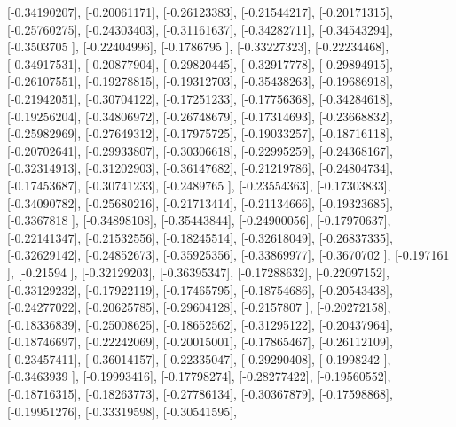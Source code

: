 \documentclass{article}
\begin{document}
       [-0.34190207],
       [-0.20061171],
       [-0.26123383],
       [-0.21544217],
       [-0.20171315],
       [-0.25760275],
       [-0.24303403],
       [-0.31161637],
       [-0.34282711],
       [-0.34543294],
       [-0.3503705 ],
       [-0.22404996],
       [-0.1786795 ],
       [-0.33227323],
       [-0.22234468],
       [-0.34917531],
       [-0.20877904],
       [-0.29820445],
       [-0.32917778],
       [-0.29894915],
       [-0.26107551],
       [-0.19278815],
       [-0.19312703],
       [-0.35438263],
       [-0.19686918],
       [-0.21942051],
       [-0.30704122],
       [-0.17251233],
       [-0.17756368],
       [-0.34284618],
       [-0.19256204],
       [-0.34806972],
       [-0.26748679],
       [-0.17314693],
       [-0.23668832],
       [-0.25982969],
       [-0.27649312],
       [-0.17975725],
       [-0.19033257],
       [-0.18716118],
       [-0.20702641],
       [-0.29933807],
       [-0.30306618],
       [-0.22995259],
       [-0.24368167],
       [-0.32314913],
       [-0.31202903],
       [-0.36147682],
       [-0.21219786],
       [-0.24804734],
       [-0.17453687],
       [-0.30741233],
       [-0.2489765 ],
       [-0.23554363],
       [-0.17303833],
       [-0.34090782],
       [-0.25680216],
       [-0.21713414],
       [-0.21134666],
       [-0.19323685],
       [-0.3367818 ],
       [-0.34898108],
       [-0.35443844],
       [-0.24900056],
       [-0.17970637],
       [-0.22141347],
       [-0.21532556],
       [-0.18245514],
       [-0.32618049],
       [-0.26837335],
       [-0.32629142],
       [-0.24852673],
       [-0.35925356],
       [-0.33869977],
       [-0.3670702 ],
       [-0.197161  ],
       [-0.21594   ],
       [-0.32129203],
       [-0.36395347],
       [-0.17288632],
       [-0.22097152],
       [-0.33129232],
       [-0.17922119],
       [-0.17465795],
       [-0.18754686],
       [-0.20543438],
       [-0.24277022],
       [-0.20625785],
       [-0.29604128],
       [-0.2157807 ],
       [-0.20272158],
       [-0.18336839],
       [-0.25008625],
       [-0.18652562],
       [-0.31295122],
       [-0.20437964],
       [-0.18746697],
       [-0.22242069],
       [-0.20015001],
       [-0.17865467],
       [-0.26112109],
       [-0.23457411],
       [-0.36014157],
       [-0.22335047],
       [-0.29290408],
       [-0.1998242 ],
       [-0.3463939 ],
       [-0.19993416],
       [-0.17798274],
       [-0.28277422],
       [-0.19560552],
       [-0.18716315],
       [-0.18263773],
       [-0.27786134],
       [-0.30367879],
       [-0.17598868],
       [-0.19951276],
       [-0.33319598],
       [-0.30541595],
\end{document}
